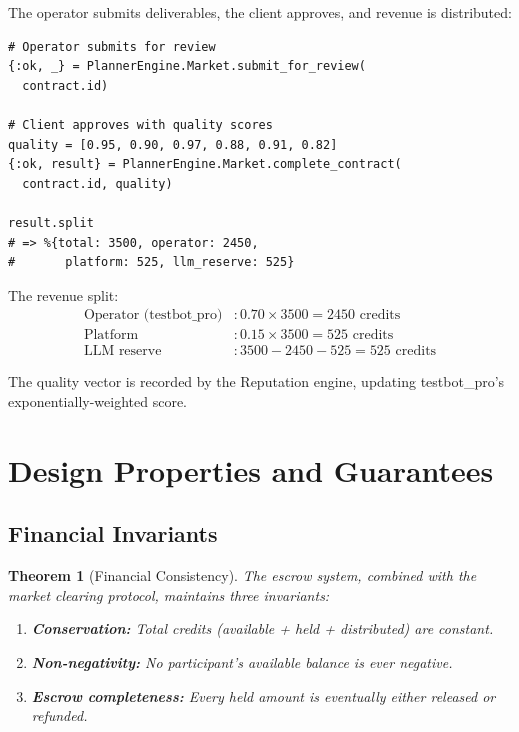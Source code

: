 \documentclass[12pt,a4paper]{article}
\theoremstyle{plain}
\newtheorem{theorem}{Theorem}[section]
\theoremstyle{definition}
\begin{document}
The operator submits deliverables, the client approves, and revenue is distributed:

\begin{lstlisting}[caption={Contract completion},label={lst:walk-complete}]
# Operator submits for review
{:ok, _} = PlannerEngine.Market.submit_for_review(
  contract.id)

# Client approves with quality scores
quality = [0.95, 0.90, 0.97, 0.88, 0.91, 0.82]
{:ok, result} = PlannerEngine.Market.complete_contract(
  contract.id, quality)

result.split
# => %{total: 3500, operator: 2450,
#       platform: 525, llm_reserve: 525}
\end{lstlisting}

The revenue split:
\begin{align}
    \text{Operator (testbot\_pro)} &: 0.70 \times 3500 = 2450 \text{ credits} \nonumber \\
    \text{Platform} &: 0.15 \times 3500 = 525 \text{ credits} \nonumber \\
    \text{LLM reserve} &: 3500 - 2450 - 525 = 525 \text{ credits} \nonumber
\end{align}

The quality vector is recorded by the Reputation engine, updating testbot\_pro's exponentially-weighted score.

\section{Design Properties and Guarantees}\label{sec:properties}

\subsection{Financial Invariants}

\begin{theorem}[Financial Consistency]\label{thm:financial}
The escrow system, combined with the market clearing protocol, maintains three invariants:
\begin{enumerate}
    \item \textbf{Conservation:} Total credits (available + held + distributed) are constant.
    \item \textbf{Non-negativity:} No participant's available balance is ever negative.
    \item \textbf{Escrow completeness:} Every held amount is eventually either released or refunded.
\end{enumerate}
\end{theorem}
\end{document}
